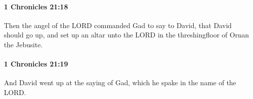 		\paragraph{1 Chronicles 21:18} %
			\label{1CHRONICLES-21-18}

			Then the angel of the LORD commanded Gad to say to David, that David should go up, and set up an altar unto the LORD in the threshingfloor of Ornan the Jebusite.


		\paragraph{1 Chronicles 21:19} %
			\label{1CHRONICLES-21-19}

			And David went up at the saying of Gad, which he spake in the name of the LORD.


